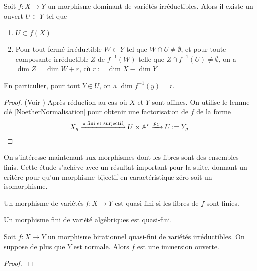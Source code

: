 \begin{thm}\label{dimensionfibres}
Soit $f:X\rightarrow Y$ un morphisme dominant de variétés irréductibles. Alors il existe un ouvert $U\subset Y$ tel que
\begin{enumerate}
\item $U\subset f(X)$
\item Pour tout fermé irréductible $W\subset Y$ tel que $W\cap U\neq \emptyset$, et pour toute composante irréductible $Z$ de $f^{-1}(W)$  telle que $Z\cap f^{-1}(U)\neq \emptyset$, on a $\dim Z=\dim W + r$, où $r:=\dim X -\dim Y$
\end{enumerate}
En particulier, pour tout $Y\in U$, on a $\dim f^{-1}(y)=r.$
\end{thm}
\begin{proof}
(Voir \cite[I.8.3]{MumfordRedBook}) Après réduction au cas où $X$ et $Y$ sont affines. On utilise le lemme clé \ref{NoetherNormalisation} pour obtenir une factorisation de $f$ de la forme 
$$X_g\xrightarrow{\pi \text{ fini et surjectif}}U\times \mathbb{A}^r \xrightarrow{p_U}U:=Y_g$$

\end{proof}

On s'intéresse maintenant aux morphismes dont les fibres sont des ensembles finis. Cette étude s'achève avec un résultat important pour la suite, donnant un critère pour qu'un morphisme bijectif en caractéristique zéro soit un isomorphisme. 

\begin{defn}
Un morphisme de variétés $f:X \rightarrow Y$ est quasi-fini si les fibres de $f$ sont finies.
\end{defn}

\begin{ex}
Un morphisme fini de variété algébriques est quasi-fini.
\end{ex}

\begin{thm}\label{ZMT}
Soit $f:X\rightarrow Y$ un morphisme birationnel quasi-fini de variétés irréductibles. On suppose de plus que $Y$ est normale. Alors $f$ est une immersion ouverte.
\end{thm}
\begin{proof}
\cite[4.4.6]{QingLiu}
\end{proof}

